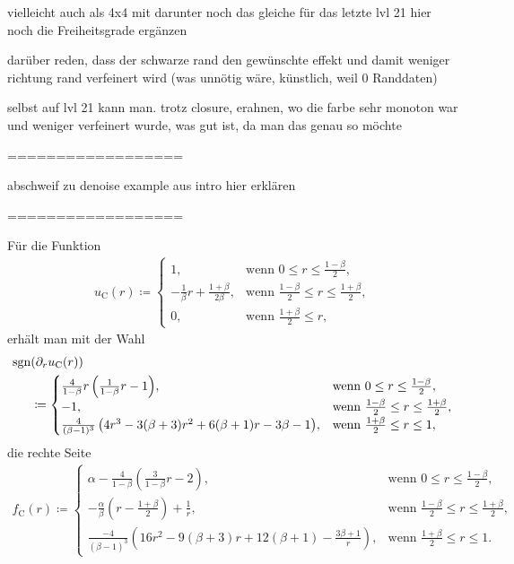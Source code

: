 vielleicht auch als 4x4 mit darunter noch das gleiche für das letzte lvl 21
hier noch die Freiheitsgrade ergänzen

darüber reden, dass der schwarze rand den gewünschte effekt und damit weniger
richtung rand verfeinert wird (was unnötig wäre, künstlich, weil 0 Randdaten)

selbst auf lvl 21 kann man. trotz closure, erahnen, wo die farbe sehr monoton 
war und weniger verfeinert wurde, was gut ist, da man das genau so möchte

==================

abschweif zu denoise example aus intro hier erklären

==================

Für die Funktion
\begin{align*}
  u_\textrm{C}(r)\coloneqq 
  \begin{cases}
    1, & \text{wenn } 0\leq r\leq\frac{1-\beta}{2},\\
    -\frac{1}{\beta}r + \frac{1+\beta}{2\beta}, & 
    \text{wenn } \frac{1-\beta}{2}\leq r\leq \frac{1+\beta}{2},\\
    0, & \text{wenn } \frac{1+\beta}{2}\leq r,
  \end{cases}
\end{align*}
erhält man mit der Wahl
\begin{align*}
  \operatorname{sgn}&(\partial_r u_\textrm{C}(r)) \\
  &\coloneqq 
  \begin{cases}
    \frac{4}{1-\beta}r\left(\frac{1}{1-\beta}r -1\right)\!, &
    \text{wenn } 0\leq r\leq\frac{1-\beta}{2},\\
    -1, & \text{wenn } \frac{1-\beta}{2}\leq r\leq \frac{1+\beta}{2},\\
    \frac{4}{(\beta-1)^3}
    \left( 4r^3-3(\beta+3)r^2 +6(\beta+1)r-3\beta-1\right)\!, & 
    \text{wenn } \frac{1+\beta}{2}\leq r\leq 1,
  \end{cases}
\end{align*}
die rechte Seite
\begin{align*}
  f_\textrm{C}(r)\coloneqq 
  \begin{cases}
    \alpha - \frac{4}{1-\beta}\left(\frac{3}{1-\beta}r - 2\right)\!, &
    \text{wenn } 0\leq r\leq\frac{1-\beta}{2},\\
    -\frac{\alpha}{\beta}\left( r-\frac{1+\beta}{2} \right) +\frac{1}{r}, & 
    \text{wenn } \frac{1-\beta}{2}\leq r\leq \frac{1+\beta}{2},\\
    \frac{-4}{(\beta-1)^3}
    \left( 16r^2 -9(\beta+3)r + 12(\beta+1) - \frac{3\beta+1}{r}\right)\!, & 
    \text{wenn } \frac{1+\beta}{2}\leq r\leq 1.
  \end{cases}
\end{align*}

